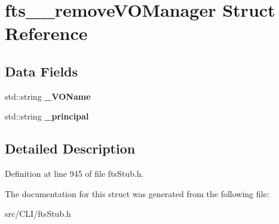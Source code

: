 \section{fts\_\-\_\-removeVOManager Struct Reference}
\label{structfts____removeVOManager}
\subsection*{Data Fields}
\begin{DoxyCompactItemize}
\item 
std::string {\bfseries \_\-VOName}\label{structfts____removeVOManager_a9debf894f8cbe85c6b066f36a119bc80}

\item 
std::string {\bfseries \_\-principal}\label{structfts____removeVOManager_aec59ca72e36f6c7a4421ba4295f90a95}

\end{DoxyCompactItemize}


\subsection{Detailed Description}


Definition at line 945 of file ftsStub.h.



The documentation for this struct was generated from the following file:\begin{DoxyCompactItemize}
\item 
src/CLI/ftsStub.h\end{DoxyCompactItemize}
